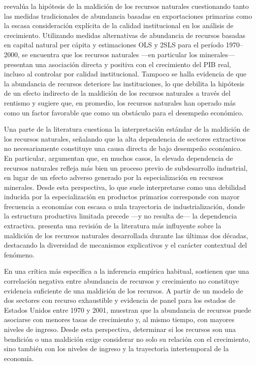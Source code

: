 \documentclass[../../PTFM.tex]{subfiles}
\begin{document}
	\textcite{Brunnschweiler2006} reevalúa la hipótesis de la maldición de los recursos naturales cuestionando tanto las medidas tradicionales de abundancia basadas en exportaciones primarias como la escasa consideración explícita de la calidad institucional en los análisis de crecimiento. Utilizando medidas alternativas de abundancia de recursos basadas en capital natural per cápita y estimaciones OLS y 2SLS para el período 1970–2000, se encuentra que los recursos naturales —en particular los minerales— presentan una asociación directa y positiva con el crecimiento del PIB real, incluso al controlar por calidad institucional. Tampoco se halla evidencia de que la abundancia de recursos deteriore las instituciones, lo que debilita la hipótesis de un efecto indirecto de la maldición de los recursos naturales a través del rentismo y sugiere que, en promedio, los recursos naturales han operado más como un factor favorable que como un obstáculo para el desempeño económico.
	
	Una parte de la literatura cuestiona la interpretación estándar de la maldición de los recursos naturales, señalando que la alta dependencia de sectores extractivos no necesariamente constituye una causa directa de bajo desempeño económico. En particular, \textcite{Morris2013} argumentan que, en muchos casos, la elevada dependencia de recursos naturales refleja más bien un proceso previo de subdesarrollo industrial, en lugar de un efecto adverso generado por la especialización en recursos minerales. Desde esta perspectiva, lo que suele interpretarse como una debilidad inducida por la especialización en productos primarios corresponde con mayor frecuencia a economías con escasa o nula trayectoria de industrialización, donde la estructura productiva limitada precede —y no resulta de— la dependencia extractiva. \textcite{Papyrakis2017} presenta una revisión de la literatura más influyente sobre la maldición de los recursos naturales desarrollada durante las últimas dos décadas, destacando la diversidad de mecanismos explicativos y el carácter contextual del fenómeno.
	
	En una crítica más específica a la inferencia empírica habitual, \textcite{Boyce2011} sostienen que una correlación negativa entre abundancia de recursos y crecimiento no constituye evidencia suficiente de una maldición de los recursos. A partir de un modelo de dos sectores con recurso exhaustible y evidencia de panel para los estados de Estados Unidos entre 1970 y 2001, muestran que la abundancia de recursos puede asociarse con menores tasas de crecimiento y, al mismo tiempo, con mayores niveles de ingreso. Desde esta perspectiva, determinar si los recursos son una bendición o una maldición exige considerar no solo su relación con el crecimiento, sino también con los niveles de ingreso y la trayectoria intertemporal de la economía.
	
\end{document}

